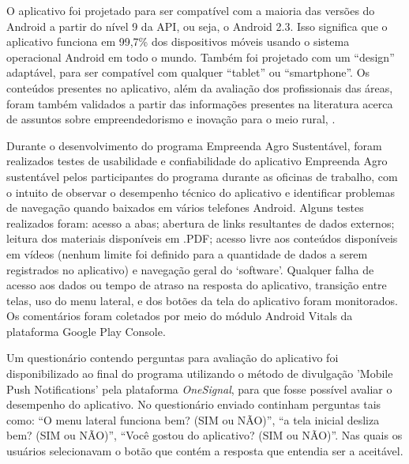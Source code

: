 O aplicativo foi projetado para ser compatível com a maioria das versões do Android a partir do nível 9 da API, ou seja, o Android 2.3. Isso significa que o aplicativo funciona em 99,7\% dos dispositivos móveis usando o sistema operacional Android em todo o mundo. Também foi projetado com um “design” adaptável, para ser compatível com qualquer “tablet” ou “smartphone”. Os conteúdos presentes no aplicativo, além da avaliação dos profissionais das áreas, foram também validados a partir das informações presentes na literatura acerca de assuntos sobre empreendedorismo e inovação para o meio rural, \cite{melo_sebrae_2008,oliveira_perfil_2006}.


Durante o desenvolvimento do programa Empreenda Agro Sustentável, foram realizados testes de usabilidade e confiabilidade do aplicativo Empreenda Agro sustentável pelos participantes do programa durante as oficinas de trabalho, com o intuito de observar o desempenho técnico do aplicativo e identificar problemas de navegação quando baixados em vários telefones Android. Alguns testes realizados foram: acesso a abas; abertura de links resultantes de dados externos; leitura dos materiais disponíveis em .PDF; acesso livre aos conteúdos disponíveis em vídeos (nenhum limite foi definido para a quantidade de dados a serem registrados no aplicativo) e navegação geral do ‘software’. Qualquer falha de acesso aos dados ou tempo de atraso na resposta do aplicativo, transição entre telas, uso do menu lateral, e dos botões da tela do aplicativo foram monitorados. Os comentários foram coletados por meio do módulo Android Vitals da plataforma Google Play Console.

Um questionário contendo perguntas para avaliação do aplicativo foi disponibilizado ao final do programa utilizando o método de divulgação 'Mobile Push Notifications' pela plataforma \textit{OneSignal}, para que fosse possível avaliar o desempenho do aplicativo. No questionário enviado continham perguntas tais como: “O menu lateral funciona bem? (SIM ou NÃO)”, “a tela inicial desliza bem? (SIM ou NÃO)”, “Você gostou do aplicativo? (SIM ou NÃO)”. Nas quais os usuários selecionavam o botão que contém a resposta que entendia ser a aceitável.







